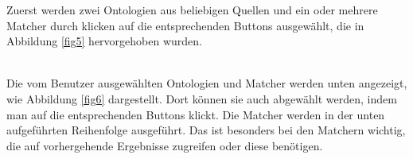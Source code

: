 		Zuerst werden zwei Ontologien aus beliebigen Quellen und ein oder
		mehrere Matcher durch klicken auf die entsprechenden Buttons ausgewählt,
		die in Abbildung \ref{fig5} hervorgehoben wurden.\\
		\begin{minipage}{\linewidth}
			\label{fig5}
		\end{minipage}
		\\
		Die vom Benutzer ausgewählten Ontologien und Matcher werden
		unten angezeigt, wie Abbildung \ref{fig6} dargestellt.
		Dort können sie auch abgewählt werden, indem man auf die entsprechenden
		Buttons klickt.
		Die Matcher werden in der unten aufgeführten Reihenfolge ausgeführt. Das ist
		besonders bei den Matchern wichtig, die auf vorhergehende Ergebnisse zugreifen
		oder diese benötigen.\\
		\begin{minipage}{\linewidth}
			\label{fig6}  
		\end{minipage}
